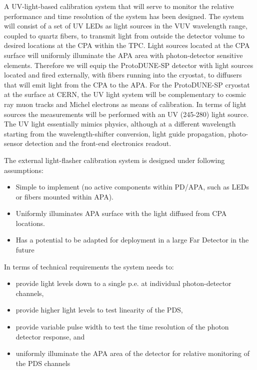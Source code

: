A UV-light-based calibration system that will serve to monitor the relative performance and time resolution of the system has been designed. %
The system will consist of a set of UV LEDs as light sources in the VUV wavelength range, coupled to quartz fibers, to transmit light from outside the detector volume to desired locations at the CPA within the TPC.
 Light sources located at the CPA surface  will uniformly illuminate the APA area with photon-detector sensitive elements.  Therefore we will equip the ProtoDUNE-SP detector with light sources located and fired externally, 
with fibers running into the cryostat, to diffusers that will emit light from the CPA to the APA.   For the ProtoDUNE-SP cryostat at the surface at CERN, the UV light system  will be complementary to cosmic ray muon 
tracks and Michel electrons as means of calibration. In terms of light sources the measurements will be performed with an UV (245-280) light source. The UV light essentially mimics physics, although at a different 
wavelength starting from the wavelength-shifter conversion, light guide propagation, photo-sensor detection and the front-end electronics readout.

	
		
				The external light-flasher calibration system is designed under following assumptions:
				
\begin{itemize}
\item Simple to implement (no active components within PD/APA, such as LEDs or fibers mounted within APA).
\item Uniformly illuminates APA surface with the light diffused from CPA locations.
\item Has a potential to be adapted for deployment in a large Far Detector in the future
\end{itemize}

	In terms of technical requirements the system needs to:
\begin{itemize}
\item provide light levels down to a single p.e. at individual photon-detector channels,
\item provide higher light levels to test linearity of the PDS,
\item provide variable pulse width to test the time resolution of the photon detector response, and
\item uniformly illuminate the APA area of the detector for relative monitoring of the PDS channels
\end{itemize}

